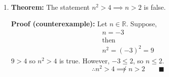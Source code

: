 \documentclass{article}
\begin{document}
\begin{enumerate}
    So $n + 2$ is even, an integer and larger than $n$ which contradicts $n$ being the largest even integer.
    
    $\therefore$ there is no largest even integer. 
    \hfill$\blacksquare$

    \item \textbf{Theorem:} The statement $n^{2} > 4 \implies n > 2$ is false.

      \textbf{Proof (counterexample):} Let $n \in \mathbb{R}$. Suppose,
      \begin{gather*}
        n = -3 \\
        \text{then} \\
        n^{2} = (-3)^{2} = 9
      \end{gather*}
      $9 > 4$ so $n^{2} > 4$ is true. However, $-3 \le 2$, so $n \le 2$.
      \[
        \therefore n^{2} > 4 \not \implies n > 2 \qquad\blacksquare
      \]
\end{enumerate}

\end{document}
